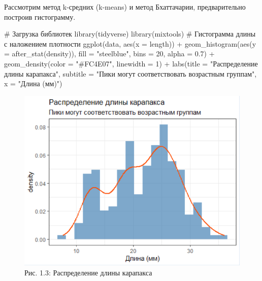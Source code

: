 \documentclass[
  letterpaper,
  DIV=11,
  numbers=noendperiod]{scrreprt}
\newenvironment{Shaded}{\begin{snugshade}}{\end{snugshade}}
\newcommand{\AttributeTok}[1]{\textcolor[rgb]{0.40,0.45,0.13}{#1}}
\newcommand{\CommentTok}[1]{\textcolor[rgb]{0.37,0.37,0.37}{#1}}
\newcommand{\DecValTok}[1]{\textcolor[rgb]{0.68,0.00,0.00}{#1}}
\newcommand{\FloatTok}[1]{\textcolor[rgb]{0.68,0.00,0.00}{#1}}
\newcommand{\FunctionTok}[1]{\textcolor[rgb]{0.28,0.35,0.67}{#1}}
\newcommand{\NormalTok}[1]{\textcolor[rgb]{0.00,0.23,0.31}{#1}}
\newcommand{\SpecialCharTok}[1]{\textcolor[rgb]{0.37,0.37,0.37}{#1}}
\newcommand{\StringTok}[1]{\textcolor[rgb]{0.13,0.47,0.30}{#1}}
\begin{document}
Рассмотрим метод k-средних (k-means) и метод Бхаттачарии, предварительно
построив гистограмму.

\begin{Shaded}
\begin{Highlighting}[]
\CommentTok{\# Загрузка библиотек}
\FunctionTok{library}\NormalTok{(tidyverse)}
\FunctionTok{library}\NormalTok{(mixtools)}
\CommentTok{\# Гистограмма длины с наложением плотности}
\FunctionTok{ggplot}\NormalTok{(data, }\FunctionTok{aes}\NormalTok{(}\AttributeTok{x =}\NormalTok{ length)) }\SpecialCharTok{+}
  \FunctionTok{geom\_histogram}\NormalTok{(}\FunctionTok{aes}\NormalTok{(}\AttributeTok{y =} \FunctionTok{after\_stat}\NormalTok{(density)), }\AttributeTok{fill =} \StringTok{"steelblue"}\NormalTok{, }\AttributeTok{bins =} \DecValTok{20}\NormalTok{, }\AttributeTok{alpha =} \FloatTok{0.7}\NormalTok{) }\SpecialCharTok{+}
  \FunctionTok{geom\_density}\NormalTok{(}\AttributeTok{color =} \StringTok{"\#FC4E07"}\NormalTok{, }\AttributeTok{linewidth =} \DecValTok{1}\NormalTok{) }\SpecialCharTok{+}
  \FunctionTok{labs}\NormalTok{(}\AttributeTok{title =} \StringTok{"Распределение длины карапакса"}\NormalTok{, }
       \AttributeTok{subtitle =} \StringTok{"Пики могут соответствовать возрастным группам"}\NormalTok{,}
       \AttributeTok{x =} \StringTok{"Длина (мм)"}\NormalTok{)}
\end{Highlighting}
\end{Shaded}

\begin{figure}[H]

{\centering \includegraphics[width=0.6\linewidth,height=\textheight,keepaspectratio]{images/hist_dens_shrimp.PNG}

}

\caption{Рис. 1.3: Распределение длины карапакса}

\end{figure}%
\end{document}

